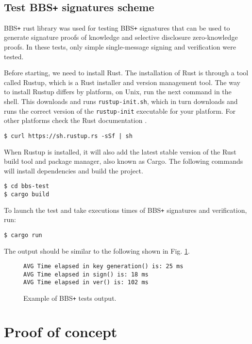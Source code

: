 \subsection{Test BBS\texttt{+} signatures scheme}
BBS\texttt{+} rust library was used for testing BBS\texttt{+} signatures that can be used to generate signature proofs of knowledge and selective disclosure zero-knowledge proofs. In these tests, only simple single-message signing and verification were tested.

Before starting, we need to install Rust. The installation of Rust is through a tool called Rustup, which is a Rust installer and version management tool. The way to install Rustup differs by platform, on Unix, run the next command in the shell. This downloads and runs \texttt{rustup-init.sh}, which in turn downloads and runs the correct version of the \texttt{rustup-init} executable for your platform. For other platforms check the Rust documentation \cite{rust-install}. \\
\begin{lstlisting}[style=terminal,frame=single]
$ curl https://sh.rustup.rs -sSf | sh
\end{lstlisting}
When Rustup is installed, it will also add the latest stable version of the Rust build tool and package manager, also known as Cargo. The following commands will install dependencies and build the project. \\
\begin{lstlisting}[style=terminal,frame=single]
$ cd bbs-test
$ cargo build
\end{lstlisting}
To launch the test and take executions times of BBS\texttt{+} signatures and verification, run:  \\
\begin{lstlisting}[style=terminal,frame=single]
$ cargo run
\end{lstlisting}
The output should be similar to the following shown in Fig. \ref{l-bbs}. \\
\begin{figure}[H]
\begin{lstlisting}[frame=single]
AVG Time elapsed in key generation() is: 25 ms
AVG Time elapsed in sign() is: 18 ms
AVG Time elapsed in ver() is: 102 ms
\end{lstlisting}
\caption{Example of BBS\texttt{+} tests output. \label{l-bbs}}
\end{figure}

\section{Proof of concept}

